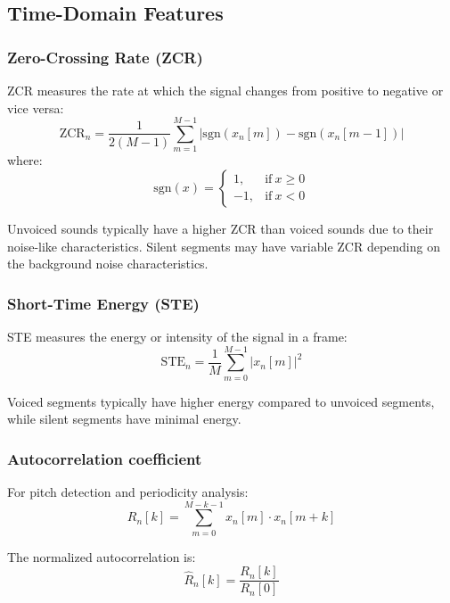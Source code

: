 \documentclass[10pt,journal,compsoc]{IEEEtran}
\begin{document}
\subsection{Time-Domain Features}

\subsubsection{Zero-Crossing Rate (ZCR)}
ZCR measures the rate at which the signal changes from positive to negative or vice versa:
\begin{equation}
\text{ZCR}_n = \frac{1}{2(M-1)} \sum_{m=1}^{M-1} |\text{sgn}(x_n[m]) - \text{sgn}(x_n[m-1])|
\end{equation}
where:
\begin{equation}
\text{sgn}(x) = 
\begin{cases} 
1, & \text{if}\ x \geq 0 \\ 
-1, & \text{if}\ x < 0 
\end{cases}
\end{equation}

Unvoiced sounds typically have a higher ZCR than voiced sounds due to their noise-like characteristics. Silent segments may have variable ZCR depending on the background noise characteristics.

\subsubsection{Short-Time Energy (STE)}
STE measures the energy or intensity of the signal in a frame:
\begin{equation}
\text{STE}_n = \frac{1}{M} \sum_{m=0}^{M-1} |x_n[m]|^2
\end{equation}

Voiced segments typically have higher energy compared to unvoiced segments, while silent segments have minimal energy.

\subsubsection{Autocorrelation coefficient}
For pitch detection and periodicity analysis:
\begin{equation}
R_n[k] = \sum_{m=0}^{M-k-1} x_n[m] \cdot x_n[m+k]
\end{equation}

The normalized autocorrelation is:
\begin{equation}
\hat{R}_n[k] = \frac{R_n[k]}{R_n[0]}
\end{equation}
\end{document}
